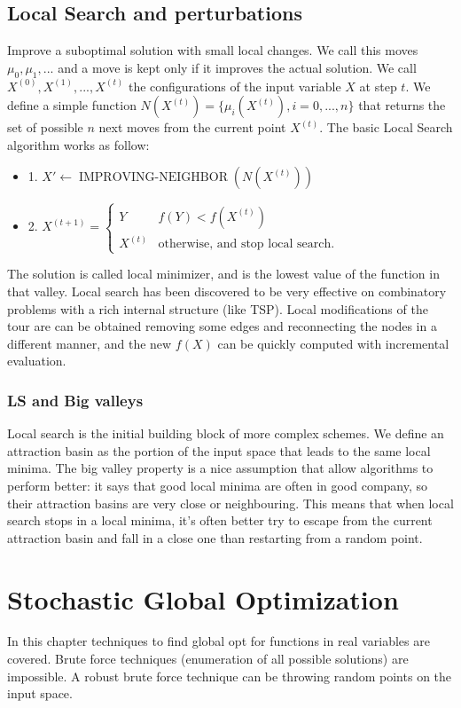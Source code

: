 \documentclass[10pt]{article}
\DeclareMathOperator{\improving}{IMPROVING-NEIGHBOR}
\begin{document}
\subsection{Local Search and perturbations}
Improve a suboptimal solution with small local changes. We call this moves $\mu_{0}, \mu_{1}, ...$ and a move is kept only if it improves the actual solution. We call $X^{(0)}, X^{(1)}, ... , X^{(t)}$ the configurations of the input variable $X$ at step $t$. We define a simple function $N(X^{(t)}) = \{\mu_{i}(X^{(t)}), i = 0, ... ,n\}$ that returns the set of possible $n$ next moves from the current point $X^{(t)}$. The basic Local Search algorithm works as follow:
\begin{itemize}
\item{1. $X' \leftarrow \improving(N(X^{(t)}))$}
\item{2. $X^{(t+1)} = \begin{cases} 
      Y & f(Y) < f(X^{(t)}) \\
      X^{(t)} & \text{otherwise, and stop local search}.
   \end{cases}
$}
\end{itemize}
The solution is called local minimizer, and is the lowest value of the function in that valley. Local search has been discovered to be very effective on combinatory problems with a rich internal structure (like TSP). Local modifications of the tour are can be obtained removing some edges and reconnecting the nodes in a different manner, and the new $f(X)$ can be quickly computed with incremental evaluation.

\subsubsection{LS and Big valleys}
Local search is the initial building block of more complex schemes. We define an attraction basin as the portion of the input space that leads to the same local minima. The big valley property is a nice assumption that allow algorithms to perform better: it says that good local minima are often in good company, so their attraction basins are very close or neighbouring. This means that when local search stops in a local minima, it's often better try to escape from the current attraction basin and fall in a close one than restarting from a random point.




\section{Stochastic Global Optimization}
In this chapter techniques to find global opt for functions in real variables are covered. Brute force techniques (enumeration of all possible solutions) are impossible. 
A robust brute force technique can be throwing random points on the input space.
\end{document}
